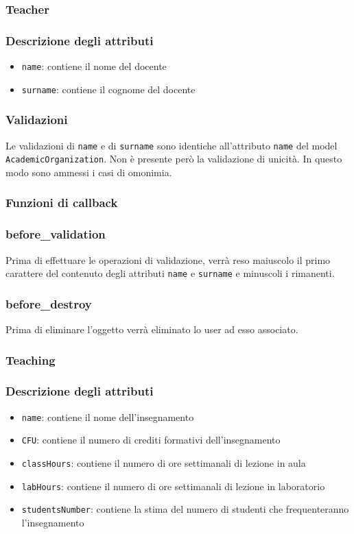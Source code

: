 \documentclass[11pt,a4paper]{article}
\begin{document}
\subsubsection{Teacher}
\subsubsection*{Descrizione degli attributi}
\begin{itemize}
 \item \verb|name|: contiene il nome del docente
 \item \verb|surname|: contiene il cognome del docente
\end{itemize}
\subsubsection*{Validazioni}
Le validazioni di \verb|name| e di \verb|surname| sono identiche all'attributo \verb|name| del model \verb|AcademicOrganization|. Non è presente però la validazione di unicità. In questo modo sono ammessi i casi di omonimia.
\subsubsection*{Funzioni di callback}
\subsubsection*{before\_validation}
Prima di effettuare le operazioni di validazione, verrà reso maiuscolo il primo carattere del contenuto degli attributi \verb|name| e \verb|surname| e minuscoli i rimanenti.
\subsubsection*{before\_destroy}
Prima di eliminare l'oggetto verrà eliminato lo user ad esso associato.
\subsubsection{Teaching}
\subsubsection*{Descrizione degli attributi}
\begin{itemize}
 \item \verb|name|: contiene il nome dell'insegnamento
 \item \verb|CFU|: contiene il numero di crediti formativi dell'insegnamento
 \item \verb|classHours|: contiene il numero di ore settimanali di lezione in aula
 \item \verb|labHours|: contiene il numero di ore settimanali di lezione in laboratorio
 \item \verb|studentsNumber|: contiene la stima del numero di studenti che frequenteranno l'insegnamento
\end{itemize}
\end{document}

